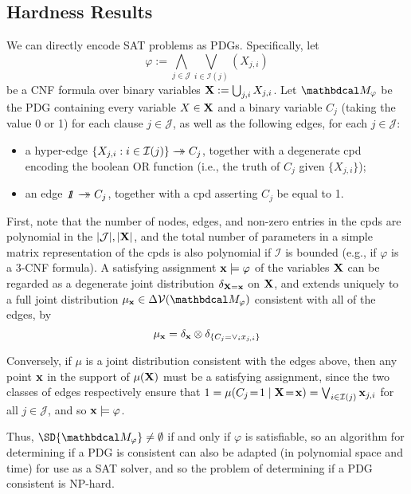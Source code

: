 \documentclass[twoside]{article}
\begin{document}
\subsection{Hardness Results}

\begin{lproof} \label{proof:consistent-NP-hard}
	We can directly encode SAT problems as PDGs.
	Specifically, let
	$$\varphi := \bigwedge_{j \in \mathcal J} \bigvee_{i \in \mathcal I(j)} (X_{j,i})$$
	be a CNF formula over binary variables $\mathbf{X} := \bigcup_{j,i} X_{j,i}$. Let
	$\dg M_\varphi$ be the PDG containing every variable $X \in \mathbf{X}$ and a binary
	variable $C_j$ (taking the value 0 or 1) for each clause $j \in \mathcal J$, as well as the following edges, for each $j \in \mathcal J$:
	\begin{itemize}
		\item a hyper-edge $\{X_{j,i} : i \in \mathcal I(j)\} \rightarrow\mathrel{\mspace{-15mu}}\rightarrow C_j$, together with a degenerate cpd
			encoding the boolean OR function (i.e., the truth of $C_j$ given $\{X_{j,i}\}$);
		\item an edge $\pdgunit \tto C_j$, together with a cpd asserting $C_j$ be equal to 1.
	\end{itemize}
	First, note that the number of nodes, edges, and non-zero entries in the cpds are polynomial in the $|\mathcal J|, |\mathbf{X}|$, and the total number of parameters in a simple matrix representation of the cpds is also polynomial if $\mathcal I$ is bounded (e.g., if $\varphi$ is a 3-CNF formula).
	A satisfying assignment $\mathbf{x} \models \varphi$ of the variables $\mathbf{X}$ can be regarded as a degenerate joint distribution $\delta_{\mathbf{X} = \mathbf{x}}$ on $\mathbf{X}$, and extends uniquely to a full joint distribution $\mu_{\mat x} \in \Delta \V(\dg M_\varphi)$ consistent with all of the edges, by
	\[ \mu_{\mathbf{x}} = \delta_{\mathbf{x}} \otimes \delta_{\{C_j = \vee_i  x_{j,i}\}} \]

 	Conversely, if $\mu$ is a joint distribution consistent with the edges above, then any point $\mathbf{x}$ in the support of $\mu(\mathbf{X})$ must be a satisfying assignment, since the two classes of edges respectively ensure that $1 =\mu(C_j\!=\! 1 \mid \mathbf{X} \!=\! \mathbf{x}) = \bigvee_{i \in \mathcal I(j)} \mathbf{x}_{j,i}$ for all $j \in \mathcal J$, and so $\mathbf{x} \models \varphi$.

	Thus, $\SD{\dg M_\varphi} \ne \emptyset$ if and only if $\varphi$ is satisfiable, so
	an algorithm for determining if a PDG is consistent can also be adapted (in polynomial space and time) for use as a SAT solver, and so the problem of determining if a PDG consistent is NP-hard.


\end{lproof}
\end{document}
